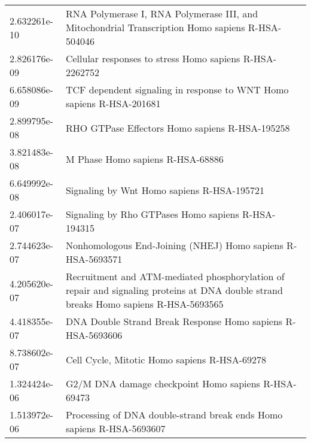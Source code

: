 \begin{longtable}{p{2.4cm}p{14.5cm}}
             2.632261e-10 &                                       RNA Polymerase I, RNA Polymerase III, and Mitochondrial Transcription Homo sapiens R-HSA-504046 \\
             2.826176e-09 &                                                                               Cellular responses to stress Homo sapiens R-HSA-2262752 \\
             6.658086e-09 &                                                                  TCF dependent signaling in response to WNT Homo sapiens R-HSA-201681 \\
             2.899795e-08 &                                                                                        RHO GTPase Effectors Homo sapiens R-HSA-195258 \\
             3.821483e-08 &                                                                                                      M Phase Homo sapiens R-HSA-68886 \\
             6.649992e-08 &                                                                                            Signaling by Wnt Homo sapiens R-HSA-195721 \\
             2.406017e-07 &                                                                                    Signaling by Rho GTPases Homo sapiens R-HSA-194315 \\
             2.744623e-07 &                                                                           Nonhomologous End-Joining (NHEJ) Homo sapiens R-HSA-5693571 \\
             4.205620e-07 &  Recruitment and ATM-mediated phosphorylation of repair and signaling proteins at DNA double strand breaks Homo sapiens R-HSA-5693565 \\
             4.418355e-07 &                                                                           DNA Double Strand Break Response Homo sapiens R-HSA-5693606 \\
             8.738602e-07 &                                                                                          Cell Cycle, Mitotic Homo sapiens R-HSA-69278 \\
             1.324424e-06 &                                                                                   G2/M DNA damage checkpoint Homo sapiens R-HSA-69473 \\
             1.513972e-06 &                                                                 Processing of DNA double-strand break ends Homo sapiens R-HSA-5693607 \\

\end{longtable}
